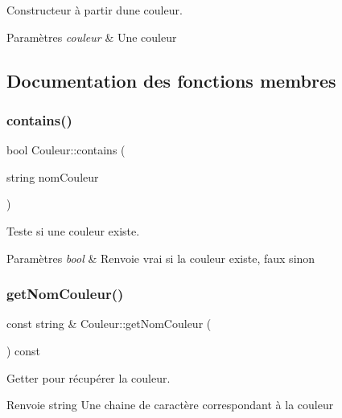 Constructeur à partir d\textquotesingle{}une couleur. 


\begin{DoxyParams}{Paramètres}
{\em couleur} & Une couleur \\
\hline
\end{DoxyParams}


\subsection{Documentation des fonctions membres}
\mbox{\label{class_couleur_ab426fe44e27a92cf0faf8fee1e086a5f}} 
\subsubsection{\texorpdfstring{contains()}{contains()}}
{\footnotesize\ttfamily bool Couleur\+::contains (\begin{DoxyParamCaption}\item[{string}]{nom\+Couleur }\end{DoxyParamCaption})}



Teste si une couleur existe. 


\begin{DoxyParams}{Paramètres}
{\em bool} & Renvoie vrai si la couleur existe, faux sinon \\
\hline
\end{DoxyParams}
\mbox{\label{class_couleur_a0e38cc8477e1618b317124ab372c3501}} 
\subsubsection{\texorpdfstring{getNomCouleur()}{getNomCouleur()}}
{\footnotesize\ttfamily const string \& Couleur\+::get\+Nom\+Couleur (\begin{DoxyParamCaption}{ }\end{DoxyParamCaption}) const}



Getter pour récupérer la couleur. 

\begin{DoxyReturn}{Renvoie}
string Une chaine de caractère correspondant à la couleur 
\end{DoxyReturn}
\mbox{\label{class_couleur_ade329eaaf3db16de47b3be59b3c13198}} 
